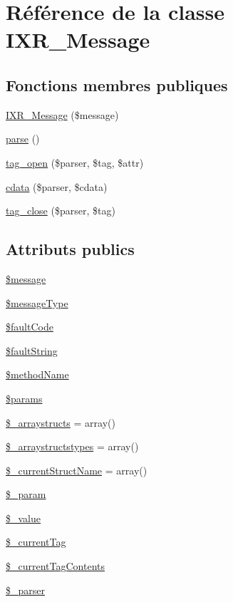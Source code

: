 \hypertarget{classIXR__Message}{
\section{R\'{e}f\'{e}rence de la classe IXR\_\-Message}
\label{classIXR__Message}
}
\subsection*{Fonctions membres publiques}
\begin{CompactItemize}
\item 
\hyperlink{classIXR__Message_a0}{IXR\_\-Message} (\$message)
\item 
\hyperlink{classIXR__Message_a1}{parse} ()
\item 
\hyperlink{classIXR__Message_a2}{tag\_\-open} (\$parser, \$tag, \$attr)
\item 
\hyperlink{classIXR__Message_a3}{cdata} (\$parser, \$cdata)
\item 
\hyperlink{classIXR__Message_a4}{tag\_\-close} (\$parser, \$tag)
\end{CompactItemize}
\subsection*{Attributs publics}
\begin{CompactItemize}
\item 
\hyperlink{classIXR__Message_o0}{\$message}
\item 
\hyperlink{classIXR__Message_o1}{\$message\-Type}
\item 
\hyperlink{classIXR__Message_o2}{\$fault\-Code}
\item 
\hyperlink{classIXR__Message_o3}{\$fault\-String}
\item 
\hyperlink{classIXR__Message_o4}{\$method\-Name}
\item 
\hyperlink{classIXR__Message_o5}{\$params}
\item 
\hyperlink{classIXR__Message_o6}{\$\_\-arraystructs} = array()
\item 
\hyperlink{classIXR__Message_o7}{\$\_\-arraystructstypes} = array()
\item 
\hyperlink{classIXR__Message_o8}{\$\_\-current\-Struct\-Name} = array()
\item 
\hyperlink{classIXR__Message_o9}{\$\_\-param}
\item 
\hyperlink{classIXR__Message_o10}{\$\_\-value}
\item 
\hyperlink{classIXR__Message_o11}{\$\_\-current\-Tag}
\item 
\hyperlink{classIXR__Message_o12}{\$\_\-current\-Tag\-Contents}
\item 
\hyperlink{classIXR__Message_o13}{\$\_\-parser}
\end{CompactItemize}


